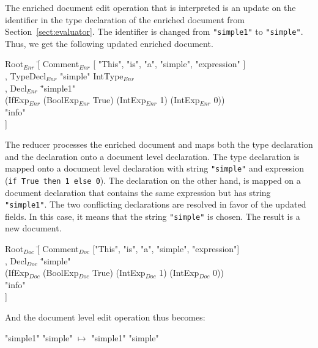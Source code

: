 The enriched document edit operation that is interpreted is an update on the identifier in the type declaration of the enriched document from Section~\ref{sect:evaluator}. The identifier is changed from \verb|"simple1"| to \verb|"simple"|. Thus, we get the following updated enriched document.

\small \ttfamily
\begin{tabbing}
Root$_{Enr}$ \= [ Comment$_{Enr}$ [ "This", "is", "a", "simple", "expression" ]\\
       \> , TypeDecl$_{Enr}$ "simple" IntType$_{Enr}$\\
       \> , Decl$_{Enr}$ \= "simple1"\\
       \>                       \> (IfExp$_{Enr}$ (BoolExp$_{Enr}$ True) (IntExp$_{Enr}$ 1) (IntExp$_{Enr}$ 0)) \\
       \>                       \> "info"\\
       \> ] 
\end{tabbing}
\rmfamily \normalsize

The reducer processes the enriched document and maps both the type declaration and the declaration onto a document level declaration. The type declaration is mapped onto a document level declaration with string \verb|"simple"| and expression (\verb|if True then 1 else 0|). The declaration on the other hand, is mapped on a document declaration that contains the same expression but has string \verb|"simple1"|. The two conflicting declarations are resolved in favor of the updated fields. In this case, it means that the string \verb|"simple"| is chosen. The result is a new document.

\small \ttfamily
\begin{tabbing}
Root$_{Doc}$ \= [ Comment$_{Doc}$ ["This", "is", "a", "simple", "expression"] \\
       \> , Decl$_{Doc}$ \= "simple" \\
       \>                        \>(IfExp$_{Doc}$ (BoolExp$_{Doc}$ True) (IntExp$_{Doc}$ 1) (IntExp$_{Doc}$ 0))\\
       \>                       \> "info"\\
       \> ] 
\end{tabbing}
\rmfamily \normalsize

And the document level edit operation thus becomes:

\small \ttfamily
\begin{tabbing}
 \ttfamily "simple1"  \ttfamily  "simple" $\mapsto$  \ttfamily  "simple1"  \ttfamily  "simple"
\end{tabbing}
\rmfamily \normalsize


